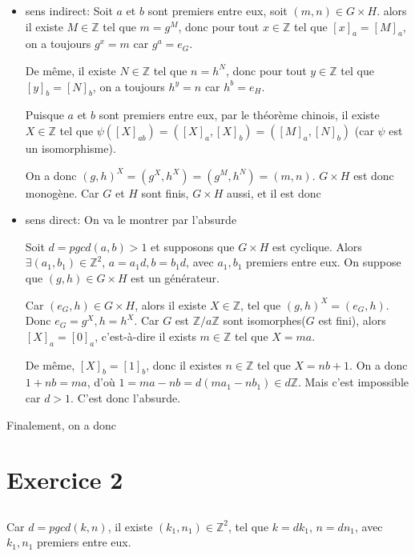 \documentclass[a4paper,12pt]{book}
\begin{document}
\begin{itemize}
    \item sens indirect: Soit $a$ et $b$ sont premiers entre eux, soit $(m,n) \in G \times H$. 
    alors  il existe $M\in \mathbb{Z}$ tel que $m=g^M$, donc pour tout $x \in \mathbb{Z}$ tel que $ [x]_a=[M]_a$, on a toujours $g^x=m$ car $g^a=e_G$. 

    De même, il existe $N\in \mathbb{Z}$ tel que $n=h^N$, donc pour tout $y \in \mathbb{Z}$ tel que $[y]_b=[N]_b$, on a toujours $h^y=n$ car $h^b=e_H$. 

    Puisque $a$ et $b$ sont premiers entre eux, par le théorème chinois, il existe $X\in \mathbb{Z}$ tel que $\psi([X]_{ab})=([X]_{a},[X]_{b})=([M]_{a},[N]_{b})$
    (car $\psi$ est un isomorphisme). 
    
    On a donc $(g,h)^X=(g^X,h^X)=(g^M,h^N)=(m,n)$. $G \times H$ est donc monogène. Car $G$ et $H$ sont finis, $G\times H$ aussi, et il est donc 
    \item sens direct: On va le montrer par l'absurde
    
    Soit $d=pgcd(a,b)>1$ et supposons que $G \times H$ est cyclique. 
    Alors $\exists(a_1,b_1) \in \mathbb{Z}^2$, $a=a_1d,b=b_1d$, avec $a_1,b_1$ premiers entre eux. On suppose que $(g,h) \in G \times H$ est un générateur. 

    Car $(e_G,h) \in G \times H$, alors il existe $X \in \mathbb{Z}$, tel que $(g,h)^X=(e_G,h)$. Donc $e_G=g^X, h=h^X$. 
    Car $G$ est $\mathbb{Z}/a\mathbb{Z}$ sont isomorphes($G$ est fini), alors $[X]_a=[0]_a$, c'est-à-dire il exists $m \in \mathbb{Z}$ tel que $X=ma$. 

    De même, $[X]_b=[1]_b$, donc il existes $n \in \mathbb{Z}$ tel que $X=nb+1$. On a donc $1+nb=ma$, d'où $1=ma-nb=d(ma_1-nb_1)\in d\mathbb{Z}$. Mais c'est impossible car $d>1$. C'est donc l'absurde.
\end{itemize}
Finalement, on a donc 

\section{Exercice 2}
\subsection{}
Car $d = pgcd(k, n)$, il existe $(k_1,n_1) \in \mathbb{Z}^2$, tel que $k=dk_1$, $n=dn_1$, avec $k_1, n_1$ premiers entre eux. 
\end{document}
